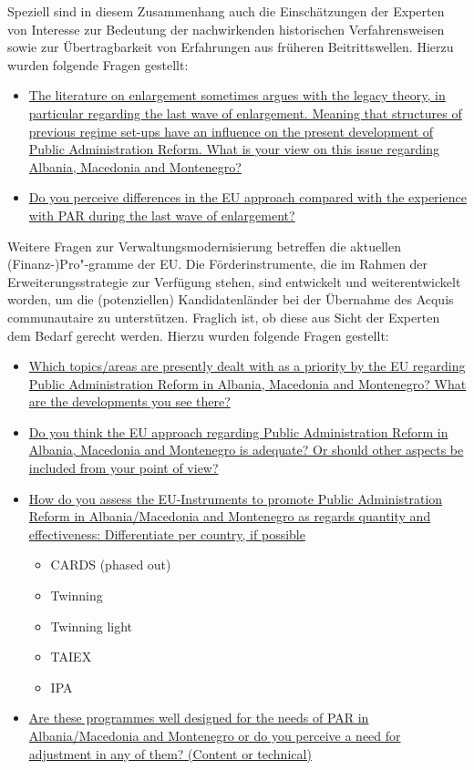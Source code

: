 Speziell sind in diesem Zusammenhang auch die Einschätzungen der Experten von Interesse zur Bedeutung der nachwirkenden historischen Verfahrensweisen sowie zur Übertragbarkeit von Erfahrungen aus früheren Beitrittswellen. Hierzu wurden folgende Fragen gestellt:
\begin{itemize}[label={}]
\item \ul{The literature on enlargement sometimes argues with the legacy theory, in particular regarding the last wave of enlargement. Meaning that structures of previous regime set-ups have an influence on the present development of Public Administration Reform. What is your view on this issue regarding Albania, Macedonia and Montenegro?}
\item \ul{Do you perceive differences in the EU approach compared with the experience with PAR during the last wave of enlargement?}
\end{itemize}
Weitere Fragen zur Verwaltungsmodernisierung betreffen die aktuellen (Finanz-)Pro"-gramme der EU. Die Förderinstrumente, die im Rahmen der Erweiterungsstrategie zur Verfügung stehen, sind entwickelt und weiterentwickelt worden, um die (potenziellen) Kandidatenländer bei der Übernahme des Acquis communautaire zu unterstützen. Fraglich ist, ob diese aus Sicht der Experten dem Bedarf gerecht werden. Hierzu wurden folgende Fragen gestellt:
\begin{itemize}[label={}]
\item \ul{Which topics/areas are presently dealt with as a priority by the EU regarding Public Administration Reform in Albania, Macedonia and Montenegro? What are the developments you see there?}
\item \ul{Do you think the EU approach regarding Public Administration Reform in Albania, Macedonia and Montenegro is adequate? Or should other aspects be included from your point of view?}
\item \ul{How do you assess the EU-Instruments to promote Public Administration Reform in Albania/Macedonia and Montenegro as regards quantity and effectiveness:
Differentiate per country, if possible}
\begin{itemize} \itemsep1pt \parskip0pt 
\item CARDS (phased out)
\item Twinning
\item Twinning light
\item TAIEX
\item IPA
\end{itemize}
\item \ul{Are these programmes well designed for the needs of PAR in Albania/Macedonia and Montenegro or do you perceive a need for adjustment in any of them? (Content or technical)}
\end{itemize}
